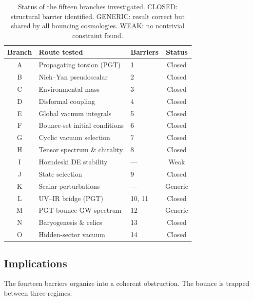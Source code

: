 \begin{table}[h]
\centering
\caption{Status of the fifteen branches investigated.  CLOSED: structural
  barrier identified.  GENERIC: result correct but shared by all bouncing
  cosmologies.  WEAK: no nontrivial constraint found.}
\label{tab:branches}
\begin{tabular}{cllc}
\hline\hline
Branch & Route tested & Barriers & Status \\
\hline
A & Propagating torsion (PGT) & 1 & Closed \\
B & Nieh--Yan pseudoscalar & 2 & Closed \\
C & Environmental mass & 3 & Closed \\
D & Disformal coupling & 4 & Closed \\
E & Global vacuum integrals & 5 & Closed \\
F & Bounce-set initial conditions & 6 & Closed \\
G & Cyclic vacuum selection & 7 & Closed \\
H & Tensor spectrum \& chirality & 8 & Closed \\
I & Horndeski DE stability & --- & Weak \\
J & State selection & 9 & Closed \\
K & Scalar perturbations & --- & Generic \\
L & UV--IR bridge (PGT) & 10, 11 & Closed \\
M & PGT bounce GW spectrum & 12 & Generic \\
N & Baryogenesis \& relics & 13 & Closed \\
O & Hidden-sector vacuum & 14 & Closed \\
\hline\hline
\end{tabular}
\end{table}


\subsection{Implications}
\label{sec:closure_implications}

The fourteen barriers organize into a coherent obstruction.  The bounce is
trapped between three regimes:

